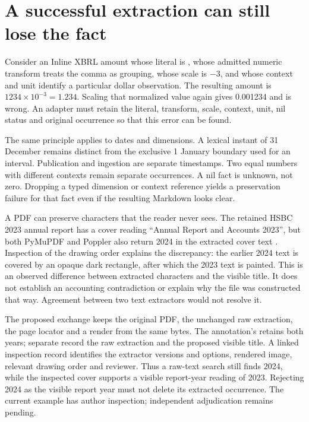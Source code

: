 \section{A successful extraction can still lose the fact}

Consider an Inline XBRL amount whose literal is , whose admitted
numeric transform treats the comma as grouping, whose scale is $-3$, and whose
context and unit identify a particular dollar observation. The resulting amount
is $1234\times10^{-3}=1.234$. Scaling that normalized value again gives 0.001234
and is wrong. An adapter must retain the literal, transform, scale, context,
unit, nil status and original occurrence so that this error can be found.

The same principle applies to dates and dimensions. A lexical instant of
31 December remains distinct from the exclusive 1 January boundary used for
an interval. Publication and ingestion are separate timestamps. Two equal
numbers with different contexts remain separate occurrences. A nil fact is
unknown, not zero. Dropping a typed dimension or context reference yields a
preservation failure for that fact even if the resulting Markdown looks clear.

A PDF can preserve characters that the reader never sees. The retained HSBC
2023 annual report has a cover reading ``Annual Report and Accounts 2023'',
but both PyMuPDF and Poppler also return 2024 in the extracted cover text
\citep[cover, physical PDF p.~1]{hsbc2023annualcover}. Inspection of the drawing
order explains the discrepancy: the earlier 2024 text is covered by an opaque
dark rectangle, after which the 2023 text is painted. This is an observed
difference between extracted characters and the visible title. It does not
establish an accounting contradiction or explain why the file was constructed
that way. Agreement between two text extractors would not resolve it.

The proposed exchange keeps the original PDF, the unchanged raw extraction,
the page locator and a render from the same bytes. The annotation's
 retains both years; separate  record the raw
extraction and the proposed visible title. A linked inspection record identifies
the extractor versions and options, rendered image, relevant drawing order and
reviewer. Thus a raw-text search still finds 2024, while the inspected cover
supports a visible report-year reading of 2023. Rejecting 2024 as the visible
report year must not delete its extracted occurrence. The current example has
author inspection; independent adjudication remains pending.

